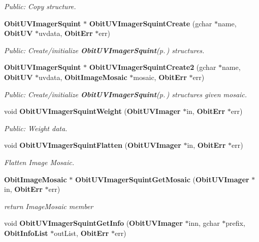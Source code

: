 \begin{CompactItemize}
\begin{CompactList}\small\item\em Public: Copy structure. \item\end{CompactList}\item 
{\bf Obit\-UVImager\-Squint} $\ast$ {\bf Obit\-UVImager\-Squint\-Create} (gchar $\ast$name, {\bf Obit\-UV} $\ast$uvdata, {\bf Obit\-Err} $\ast$err)
\begin{CompactList}\small\item\em Public: Create/initialize {\bf Obit\-UVImager\-Squint}{\rm (p.\,\pageref{structObitUVImagerSquint})} structures. \item\end{CompactList}\item 
{\bf Obit\-UVImager\-Squint} $\ast$ {\bf Obit\-UVImager\-Squint\-Create2} (gchar $\ast$name, {\bf Obit\-UV} $\ast$uvdata, {\bf Obit\-Image\-Mosaic} $\ast$mosaic, {\bf Obit\-Err} $\ast$err)
\begin{CompactList}\small\item\em Public: Create/initialize {\bf Obit\-UVImager\-Squint}{\rm (p.\,\pageref{structObitUVImagerSquint})} structures given mosaic. \item\end{CompactList}\item 
void {\bf Obit\-UVImager\-Squint\-Weight} ({\bf Obit\-UVImager} $\ast$in, {\bf Obit\-Err} $\ast$err)
\begin{CompactList}\small\item\em Public: Weight data. \item\end{CompactList}\item 
void {\bf Obit\-UVImager\-Squint\-Flatten} ({\bf Obit\-UVImager} $\ast$in, {\bf Obit\-Err} $\ast$err)
\begin{CompactList}\small\item\em Flatten Image Mosaic. \item\end{CompactList}\item 
{\bf Obit\-Image\-Mosaic} $\ast$ {\bf Obit\-UVImager\-Squint\-Get\-Mosaic} ({\bf Obit\-UVImager} $\ast$in, {\bf Obit\-Err} $\ast$err)
\begin{CompactList}\small\item\em return Image\-Mosaic member \item\end{CompactList}\item 
void {\bf Obit\-UVImager\-Squint\-Get\-Info} ({\bf Obit\-UVImager} $\ast$inn, gchar $\ast$prefix, {\bf Obit\-Info\-List} $\ast$out\-List, {\bf Obit\-Err} $\ast$err)

\end{CompactItemize}

